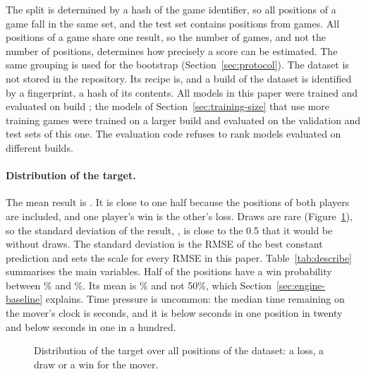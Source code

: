 \documentclass[11pt]{article}
\begin{document}
The split is determined by a hash of the game identifier, so all positions
of a game fall in the same set, and the test set contains positions from
 games. All positions of a game share one result, so the
number of games, and not the number of positions, determines how precisely a
score can be estimated. The same grouping is used for the bootstrap
(Section~\ref{sec:protocol}). The dataset is not stored in the repository.
Its recipe is, and a build of the dataset is identified by a fingerprint, a
hash of its contents. All models in this paper were trained and evaluated on
build \ifmore; the models of
Section~\ref{sec:training-size} that use more training games were trained on
a larger build and evaluated on the validation and test sets of this
one\fi. The evaluation code refuses to rank models evaluated on different
builds.

\begin{table}[htbp]\centering\small
{}
\caption{Dataset statistics by split. The mean target is the mean result for
the mover.}
\label{tab:data}
\end{table}

\iflook
\paragraph{Distribution of the target.}
The mean result is . It is close to one half because the
positions of both players are included, and one player's win is the other's
loss. Draws are rare (Figure~\ref{fig:label}), so the standard deviation of
the result, , is close to the 0.5 that it would be without draws.
The standard deviation is the RMSE of the best constant prediction and sets
the scale for every RMSE in this paper. Table~\ref{tab:describe} summarises
the main variables. Half of the positions have a win probability between
\% and \%. Its mean is
\% and not 50\%, which
Section~\ref{sec:engine-baseline} explains. Time pressure is uncommon: the
median time remaining on the mover's clock is  seconds,
and it is below  seconds in one position in twenty and
below  seconds in one in a hundred.

\begin{figure}[htbp]\centering
{}
\caption{Distribution of the target over all positions of the dataset: a
loss, a draw or a win for the mover.}
\label{fig:label}
\end{figure}
\end{document}
